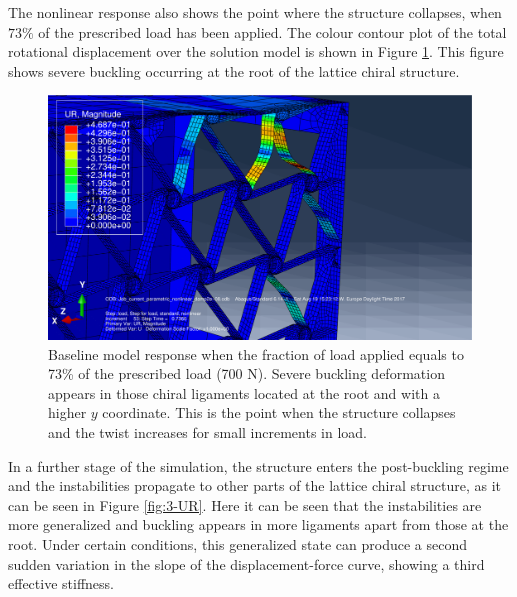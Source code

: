   The nonlinear response also shows the point where the structure collapses, when $73\%$ of the prescribed load has been applied. The colour contour plot of the total rotational displacement over the solution model is shown in Figure \ref{fig:2-UR}. This figure shows severe buckling occurring at the root of the lattice chiral structure.

  \begin{figure}[!htpb] %
    \centering
    \includegraphics[width=0.8 \textwidth]{figures/result-sim/2-UR}
    \caption[Baseline model response when the fraction of load applied equals to 73\% of the prescribed load (700 N)]{Baseline model response when the fraction of load applied equals to 73\% of the prescribed load (700 N). Severe buckling deformation appears in those chiral ligaments located at the root and with a higher $y$ coordinate. This is the point when the structure collapses and the twist increases for small increments in load.}\label{fig:2-UR}
  \end{figure}

  In a further stage of the simulation, the structure enters the post-buckling regime and the instabilities propagate to other parts of the lattice chiral structure, as it can be seen in Figure \ref{fig:3-UR}. Here it can be seen that the instabilities are more generalized and buckling appears in more ligaments apart from those at the root. Under certain conditions, this generalized state can produce a second sudden variation in the slope of the displacement-force curve, showing a third effective stiffness. 

